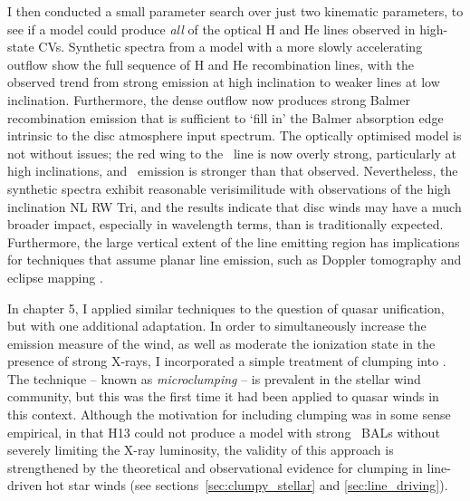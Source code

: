 I then conducted a small parameter search over just two kinematic parameters, 
to see if a model could produce {\em all} of the optical H and He lines observed 
in high-state CVs. Synthetic spectra from a model 
with a more slowly accelerating outflow show 
the full sequence of H and He recombination lines, with 
the observed trend from strong emission at high inclination to weaker lines
at low inclination. Furthermore, the dense outflow now produces strong Balmer
recombination emission that is sufficient to `fill in' the Balmer 
absorption edge intrinsic to the disc atmosphere input spectrum. The optically
optimised model is not without issues; the red wing to the \civ\ line
is now overly strong, particularly at high inclinations, and \heii\ emission
is stronger than that observed. Nevertheless, the synthetic spectra exhibit
reasonable verisimilitude with observations of the high inclination NL RW Tri,
and the results indicate that disc winds may have a much broader impact,
especially in wavelength terms, than is traditionally expected. Furthermore,
the large vertical extent of the line emitting region has implications
for techniques that assume planar line emission, such as Doppler tomography 
\citep[e.g.][]{marsh1988} and eclipse mapping \citep[e.g.][]{horne1994}.

In chapter 5, I applied similar techniques to the question of quasar 
unification, but with one additional adaptation. In order to simultaneously
increase the emission measure of the wind, as well as moderate the ionization
state in the presence of strong X-rays, I incorporated a simple treatment of clumping 
into \py. The technique -- known as {\em microclumping} -- is prevalent 
in the stellar wind community, but this was the first time it had been
applied to quasar winds in this context. Although the motivation for including
clumping was in some sense empirical, in that H13 could not produce a 
model with strong \civ\ BALs without severely limiting the X-ray luminosity, 
the validity of this approach is strengthened by the theoretical and observational
evidence for clumping in line-driven hot star winds 
(see sections~\ref{sec:clumpy_stellar} and \ref{sec:line_driving}).

